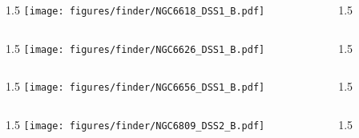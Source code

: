 \documentclass[final]{beamer}
\newlength{\colwidth}
\begin{document}

\begin{frame}[t]{}
    \begin{columns}[T]
        \begin{column}{1.5\colwidth}
            \centering
            \texttt{[image: figures/finder/NGC6618\_DSS1\_B.pdf]}
        \end{column}
        \begin{column}{1.5\colwidth}
            \Large
            
        \end{column}
    \end{columns}
    \vspace{\fill}
    \begin{columns}[T]
        \begin{column}{1.5\colwidth}
            \centering
            \texttt{[image: figures/finder/NGC6626\_DSS1\_B.pdf]}
        \end{column}
        \begin{column}{1.5\colwidth}
            \Large
            
        \end{column}
    \end{columns}
\end{frame}


\begin{frame}[t]{}
    \begin{columns}[T]
        \begin{column}{1.5\colwidth}
            \centering
            \texttt{[image: figures/finder/NGC6656\_DSS1\_B.pdf]}
        \end{column}
        \begin{column}{1.5\colwidth}
            \Large
            
        \end{column}
    \end{columns}
    \vspace{\fill}
    \begin{columns}[T]
        \begin{column}{1.5\colwidth}
            \centering
            \texttt{[image: figures/finder/NGC6809\_DSS2\_B.pdf]}
        \end{column}
        \begin{column}{1.5\colwidth}
            \Large
            
        \end{column}
    \end{columns}
\end{frame}
\end{document}

